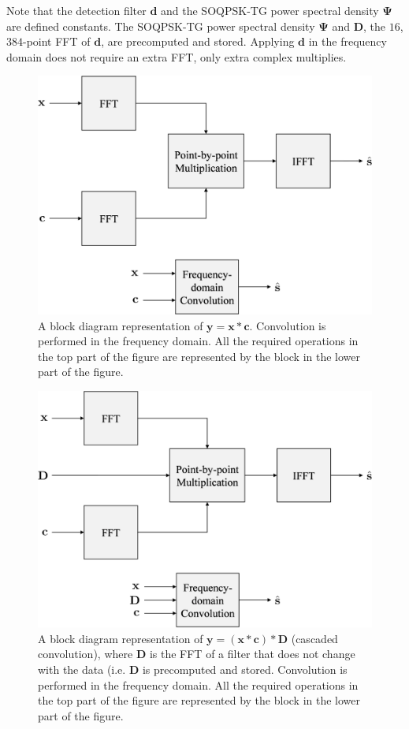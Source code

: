 Note that the detection filter $\mathbf{d}$ and the SOQPSK-TG power spectral density $\mathbf{\Psi}$ are defined constants.
The SOQPSK-TG power spectral density $\mathbf{\Psi}$ and $\mathbf{D}$, the $16$,$384$-point FFT of $\mathbf{d}$, are precomputed and stored.
Applying $\mathbf{d}$ in the frequency domain does not require an extra FFT, only extra complex multiplies.
\begin{figure}
	\centering\includegraphics[width=7.73in/100*55]{figures/eq_GPUimplementation/Conv2.pdf}
	\caption{A block diagram representation of $\mathbf{y} = \mathbf{x} * \mathbf{c}$.
			 Convolution is performed in the frequency domain.
			 All the required operations in the top part of the figure are represented by the block in the lower part of the figure.}
	\label{fig:Conv2}
\end{figure}
\begin{figure}
	\centering\includegraphics[width=7.78in/100*55]{figures/eq_GPUimplementation/Conv3.pdf}
	\caption{A block diagram representation of $\mathbf{y} = (\mathbf{x} * \mathbf{c} ) * \mathbf{D}$ (cascaded convolution), where $\mathbf{D}$ is the FFT of a filter that does not change with the data (i.e. $\mathbf{D}$ is precomputed and stored.
			 Convolution is performed in the frequency domain.
			 All the required operations in the top part of the figure are represented by the block in the lower part of the figure.}
	\label{fig:Conv3}
\end{figure}

